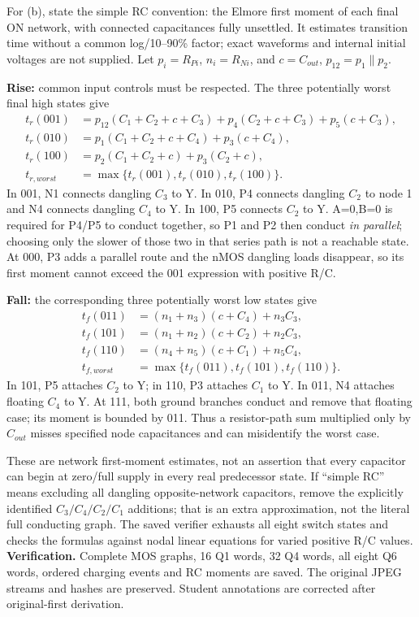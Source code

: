 \documentclass[10pt]{article}
\begin{document}
For (b), state the simple RC convention: the Elmore first moment of each final ON network, with connected capacitances fully unsettled. It estimates transition time without a common log/10--90\% factor; exact waveforms and internal initial voltages are not supplied. Let $p_i=R_{Pi}$, $n_i=R_{Ni}$, and $c=C_{out}$, $p_{12}=p_1\parallel p_2$.

\textbf{Rise:} common input controls must be respected. The three potentially worst final high states give
\begin{align*}
t_r(001)&=p_{12}(C_1+C_2+c+C_3)+p_4(C_2+c+C_3)+p_5(c+C_3),\\
t_r(010)&=p_1(C_1+C_2+c+C_4)+p_3(c+C_4),\\
t_r(100)&=p_2(C_1+C_2+c)+p_3(C_2+c),\\
\boxed{t_{r,worst}}&=\boxed{\max\{t_r(001),t_r(010),t_r(100)\}}.
\end{align*}
In 001, N1 connects dangling $C_3$ to Y. In 010, P4 connects dangling $C_2$ to node 1 and N4 connects dangling $C_4$ to Y. In 100, P5 connects $C_2$ to Y. A=0,B=0 is required for P4/P5 to conduct together, so P1 and P2 then conduct \emph{in parallel}; choosing only the slower of those two in that series path is not a reachable state. At 000, P3 adds a parallel route and the nMOS dangling loads disappear, so its first moment cannot exceed the 001 expression with positive R/C.

\textbf{Fall:} the corresponding three potentially worst low states give
\begin{align*}
t_f(011)&=(n_1+n_3)(c+C_4)+n_3C_3,\\
t_f(101)&=(n_1+n_2)(c+C_2)+n_2C_3,\\
t_f(110)&=(n_4+n_5)(c+C_1)+n_5C_4,\\
\boxed{t_{f,worst}}&=\boxed{\max\{t_f(011),t_f(101),t_f(110)\}}.
\end{align*}
In 101, P5 attaches $C_2$ to Y; in 110, P3 attaches $C_1$ to Y. In 011, N4 attaches floating $C_4$ to Y. At 111, both ground branches conduct and remove that floating case; its moment is bounded by 011. Thus a resistor-path sum multiplied only by $C_{out}$ misses specified node capacitances and can misidentify the worst case.

These are network first-moment estimates, not an assertion that every capacitor can begin at zero/full supply in every real predecessor state. If ``simple RC'' means excluding all dangling opposite-network capacitors, remove the explicitly identified $C_3/C_4/C_2/C_1$ additions; that is an extra approximation, not the literal full conducting graph. The saved verifier exhausts all eight switch states and checks the formulas against nodal linear equations for varied positive R/C values.
\textbf{Verification.} Complete MOS graphs, 16 Q1 words, 32 Q4 words, all eight Q6 words, ordered charging events and RC moments are saved. The original JPEG streams and hashes are preserved. Student annotations are corrected after original-first derivation.
\end{document}
